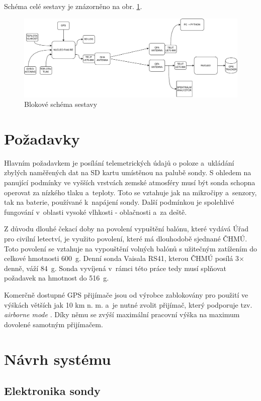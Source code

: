 \documentclass[twoside]{ctuthesis}
\theoremstyle{plain}
\theoremstyle{definition}
\theoremstyle{note}
\begin{document}
Schéma celé sestavy je znázorněno na obr. \ref{fig:sestava:blokac}.
\begin{figure}
	\centering
	\includegraphics[width=\textwidth]{Figures/sonda_blokac.drawio.pdf}
	\caption{Blokové schéma sestavy}
	\label{fig:sestava:blokac}
\end{figure}

	\section{Požadavky}
	Hlavním požadavkem je posílání telemetrických údajů o poloze a~ukládání zbylých naměřených dat na SD kartu umístěnou na palubě sondy. S ohledem na panující podmínky ve vyšších vrstvách zemské atmosféry musí být sonda schopna operovat za nízkého tlaku a~teploty. Toto se vztahuje jak na mikročipy a~senzory, tak na baterie, používané k~napájení sondy. Další podmínkou je spolehlivé fungování v~oblasti vysoké vlhkosti - oblačnosti a~za deště. 

	Z důvodu dlouhé čekací doby na povolení vypuštění balónu, které vydává Úřad pro civilní letectví, je využito povolení, které má dlouhodobě sjednané ČHMÚ. Toto povolení se vztahuje na vypouštění volných balónů s užitečným zatížením do celkové hmotnosti 600~g. Denní sonda Vaisala RS41, kterou ČHMÚ posílá 3$\times$ denně, váží 84~g. Sonda vyvíjená v~rámci této práce tedy musí splňovat požadavek na hmotnost do 516~g.

	Komerčně dostupné GPS přijímače jsou od výrobce zablokovány pro použití ve výškách větších jak 10 km n. m. \cite{gps_lck} a~je nutné zvolit přijímač, který podporuje tzv. \textit{airborne mode} \cite{ublox_modes}. Díky němu se zvýší maximální pracovní výška na maximum dovolené samotným přijímačem. 


	\section{Návrh systému}
		\subsection{Elektronika sondy}
\end{document}
